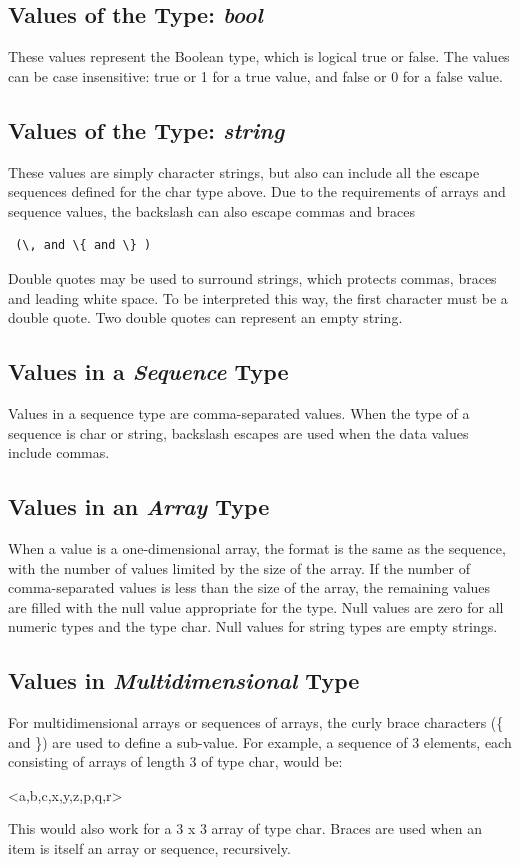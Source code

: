 \documentclass[10pt, a4paper, oneside]{article}
\renewcommand\_{\textunderscore\allowbreak} %
\begin{document}
{\subsection{Values of the Type:  \emph{bool}} These values represent the Boolean type, which is logical true or false.  The values can be case insensitive: true or 1 for a true value, and false or 0 for a false value.
\subsection{Values of the Type: \emph{string}} These values are simply character strings, but also can include all the escape sequences defined for the char type above.  Due to the requirements of arrays and sequence values, the backslash can also escape commas and braces \begin{verbatim} (\, and \{ and \} )\end{verbatim} Double quotes may be used to surround strings, which protects commas, braces and leading white space. To be interpreted this way, the first character must be a double quote. Two double quotes can represent an empty string.
\subsection{Values in a \emph{Sequence} Type} Values in a sequence type are comma-separated values.  When the type of a sequence is char or string, backslash escapes are used when the data values include commas.
\subsection{Values in an \emph{Array} Type} When a value is a one-dimensional array, the format is the same as the sequence, with the number of values limited by the size of the array.  If the number of comma-separated values is less than the size of the array, the remaining values are filled with the null value appropriate for the type.  Null values are zero for all numeric types and the type char.  Null values for string types are empty strings.
\subsection{Values in \emph{Multidimensional} Type}For multidimensional arrays or sequences of arrays, the curly brace characters (\{ and \}) are used to define a sub-value.  For example, a sequence of 3 elements, each consisting of arrays of length 3 of type char, would be:\begin{ocpixml}
<{a,b,c},{x,y,z},{p,q,r}>\end{ocpixml}
This would also work for a 3 x 3 array of type char.  Braces are used when an item is itself an array or sequence, recursively.
}
\end{document}
